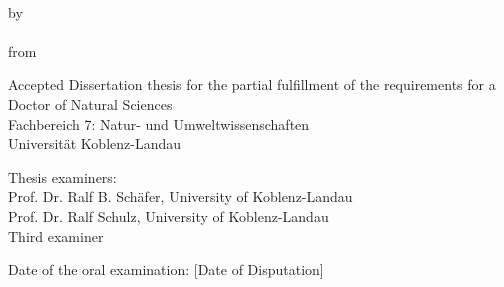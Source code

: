 \begin{titlepage}
    \begin{center}
        \large


        \begingroup
            \textbf{\LARGE\spacedallcaps{\myTitleOnTitlePageLineOne}}\\[0.5em]
            \spacedallcaps{\myTitleOnTitlePageLineTwo}
        \endgroup
        
        \vfill

        \begingroup
            by\\[1em]
            \Large \spacedlowsmallcaps{\myName} \\
            \small from \spacedlowsmallcaps{\myLocation}
        \endgroup

        \vfill

        \begingroup
            \small
            Accepted Dissertation thesis for the partial fulfillment of the requirements for a \\
            Doctor of Natural Sciences \\
            Fachbereich 7: Natur- und Umweltwissenschaften \\
            Universität Koblenz-Landau
        \endgroup

        \vfill

        \begingroup
            \small
            Thesis examiners: \\
            Prof. Dr. Ralf B. Schäfer, University of Koblenz-Landau\\
            Prof. Dr. Ralf Schulz, University of Koblenz-Landau\\
            Third examiner
        \endgroup

        \vfill

        \begingroup
            \small
            Date of the oral examination: [Date of Disputation]
        \endgroup
        
        \vfill                      

    \end{center}       
\end{titlepage}   
 
